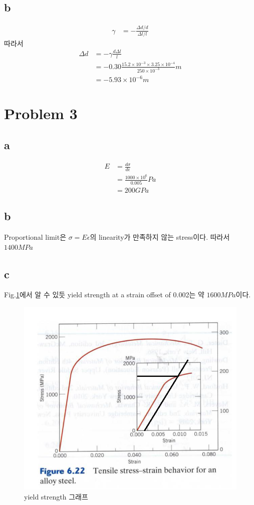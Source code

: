 \documentclass[a4paper]{oblivoir}
\begin{document}
\subsection{b}
\begin{align}
	\gamma &= - \frac{\Delta d / d}{\Delta l / l}
\end{align}
따라서
\begin{align}
	\Delta d &= - \gamma \frac{d\Delta l}{ l}\\
	&= - 0.30 \frac{15.2\times 10^{-3}\times 3.25 \times 10^{-4}}{250\times10^{-3}}m\\
	&= -5.93 \times 10^{-6}m
\end{align}

\section{Problem 3}
\subsection{a}
\begin{align}
	E &= \frac{d\sigma}{d\epsilon}\\
	&= \frac{1000\times10^{6}}{0.005} Pa\\
	&= 200 GPa
\end{align}

\subsection{b}
Proportional limit은 $\sigma = E \epsilon$의 linearity가 만족하지 않는 stress이다. 따라서 $1400MPa$

\subsection{c}
Fig.\ref{fig:p3c}에서 알 수 있듯 yield strength at a strain offset of 0.002는 약 $1600MPa$이다.
\begin{figure}[h]
    \centering
    \includegraphics[width=0.5\linewidth]{p3c.png}
    \caption{\label{fig:p3c} yield strength 그래프}
\end{figure}
\end{document}
